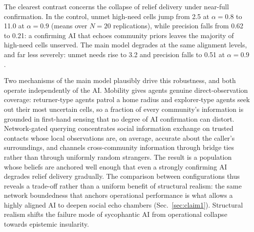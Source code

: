 \documentclass[pdflatex,sn-basic]{sn-jnl}
\begin{document}
The clearest contrast concerns the collapse of relief delivery under near-full confirmation. In the control, unmet high-need cells jump from 2.5 at $\alpha = 0.8$ to 11.0 at $\alpha = 0.9$ (means over $N = 20$ replications), while precision falls from 0.62 to 0.21: a confirming AI that echoes community priors leaves the majority of high-need cells unserved. The main model degrades at the same alignment levels, and far less severely: unmet needs rise to 3.2 and precision falls to 0.51 at $\alpha = 0.9$.

Two mechanisms of the main model plausibly drive this robustness, and both operate independently of the AI. Mobility gives agents genuine direct-observation coverage: returner-type agents patrol a home radius and explorer-type agents seek out their most uncertain cells, so a fraction of every community's information is grounded in first-hand sensing that no degree of AI confirmation can distort. Network-gated querying concentrates social information exchange on trusted contacts whose local observations are, on average, accurate about the caller's surroundings, and channels cross-community information through bridge ties rather than through uniformly random strangers. The result is a population whose beliefs are anchored well enough that even a strongly confirming AI degrades relief delivery gradually. The comparison between configurations thus reveals a trade-off rather than a uniform benefit of structural realism: the same network boundedness that anchors operational performance is what allows a highly aligned AI to deepen social echo chambers (Sec.~\ref{sec:claim1}). Structural realism shifts the failure mode of sycophantic AI from operational collapse towards epistemic insularity.
\end{document}
